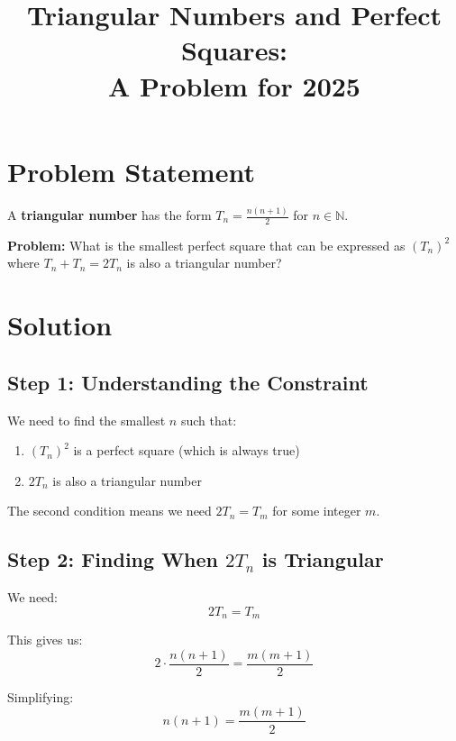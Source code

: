 \documentclass[12pt]{article}
\title{Triangular Numbers and Perfect Squares:\\A Problem for 2025}
\author{}
\date{}
\begin{document}
\maketitle

\section*{Problem Statement}

A \textbf{triangular number} has the form $T_n = \frac{n(n+1)}{2}$ for $n \in \mathbb{N}$.

\vspace{0.3cm}

\textbf{Problem:} What is the smallest perfect square that can be expressed as $(T_n)^2$ where $T_n + T_n = 2T_n$ is also a triangular number?

\vspace{1cm}

\section*{Solution}

\subsection*{Step 1: Understanding the Constraint}

We need to find the smallest $n$ such that:
\begin{enumerate}
\item $(T_n)^2$ is a perfect square (which is always true)
\item $2T_n$ is also a triangular number
\end{enumerate}

The second condition means we need $2T_n = T_m$ for some integer $m$.

\subsection*{Step 2: Finding When $2T_n$ is Triangular}

We need:
\begin{equation}
2T_n = T_m
\end{equation}

This gives us:
\begin{equation}
2 \cdot \frac{n(n+1)}{2} = \frac{m(m+1)}{2}
\end{equation}

Simplifying:
\begin{equation}
n(n+1) = \frac{m(m+1)}{2}
\end{equation}
\end{document}
